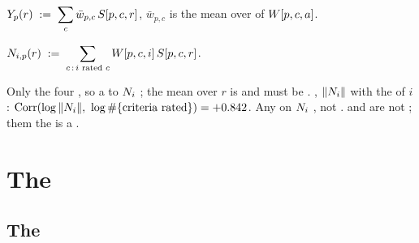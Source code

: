 \begin{definition}
\label{def:score}
$\displaystyle Y_p(r) \;:=\; \sum_{c} \bar w_{p,c}\,S[p,c,r]$, 
$\bar w_{p,c}$ is the mean over  of $W[p,c,a]$.
\end{definition}

\begin{definition}
\label{def:ni}
$\displaystyle N_{i,p}(r) \;:=\; \sum_{c \,:\, i \text{ rated } c} W[p,c,i]\,S[p,c,r]$.
\end{definition}

\begin{remark}
\label{rem:normalise}
Only   the four   , so  a  to
$N_i$  ; the mean over $r$ is   and must be
. , $\|N_i\|$   with the  of 
$i$ : 
$\operatorname{Corr}(\log\|N_i\|,\ \log \#\{\text{criteria rated}\}) = +0.842$. Any 
on  $N_i$   \emph{}, not .  and
 are not ;  them the  is a  .
\end{remark}

\section{The  }
\label{sec:elicit}

\subsection{The  }

